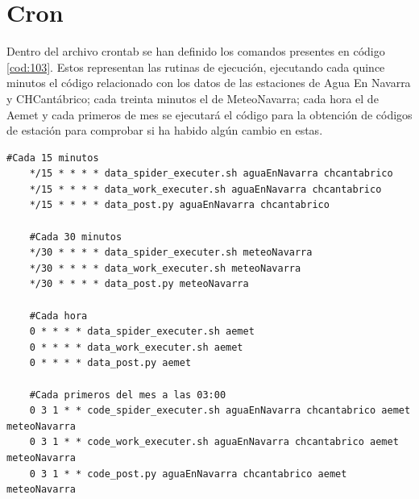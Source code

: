\section{Cron}
Dentro del archivo crontab se han definido los comandos presentes en código \ref{cod:103}. Estos representan las rutinas de ejecución, ejecutando cada quince minutos el código relacionado con los datos de las estaciones de Agua En Navarra y CHCantábrico; cada treinta minutos el de MeteoNavarra; cada hora el de Aemet y cada primeros de mes se ejecutará el código para la obtención de códigos de estación para comprobar si ha habido algún cambio en estas.

\begin{lstlisting}[caption={Trabajos configurados para ser ejecutados por Cron}, label=cod:103]
	#Cada 15 minutos
	*/15 * * * * data_spider_executer.sh aguaEnNavarra chcantabrico
	*/15 * * * * data_work_executer.sh aguaEnNavarra chcantabrico
	*/15 * * * * data_post.py aguaEnNavarra chcantabrico
	
	#Cada 30 minutos
	*/30 * * * * data_spider_executer.sh meteoNavarra
	*/30 * * * * data_work_executer.sh meteoNavarra
	*/30 * * * * data_post.py meteoNavarra
	
	#Cada hora
	0 * * * * data_spider_executer.sh aemet
	0 * * * * data_work_executer.sh aemet
	0 * * * * data_post.py aemet

	#Cada primeros del mes a las 03:00
	0 3 1 * * code_spider_executer.sh aguaEnNavarra chcantabrico aemet meteoNavarra
	0 3 1 * * code_work_executer.sh aguaEnNavarra chcantabrico aemet meteoNavarra
	0 3 1 * * code_post.py aguaEnNavarra chcantabrico aemet meteoNavarra
\end{lstlisting}